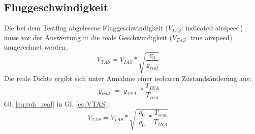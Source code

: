 \subsection{Fluggeschwindigkeit}
Die bei dem Testflug abgelesene Fluggeschwindigkeit ($V_{IAS}$: indicated airspeed) muss vor der Auswertung in die reale Geschwindigkeit ($V_{TAS}$: true airspeed) umgerechnet werden.
\begin{equation} \label{eq:VTAS}
V_{TAS}=V_{IAS}*\sqrt{\frac{\varrho_0}{\varrho_{real}}}
\end{equation} 
Die reale Dichte ergibt sich unter Annahme einer isobaren Zustandsänderung aus:
\begin{equation} \label{eq:roh_real}
\varrho_{real} = \varrho_{INA} * \frac{T_{INA}}{T_{real}}
\end{equation}
Gl. \ref{eq:roh_real} in Gl. \ref{eq:VTAS}:
\begin{equation}
V_{TAS}=V_{IAS}*\sqrt{\frac{\varrho_0}{\varrho_0}*\frac{T_{real}}{T_{INA}}}
\end{equation}
\newpage